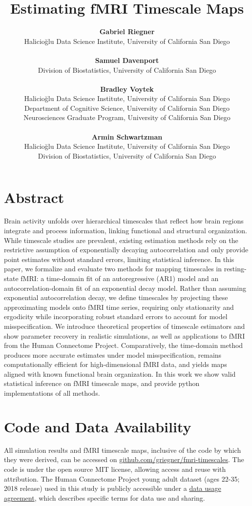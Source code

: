 \documentclass[9pt]{article}
\title{Estimating fMRI Timescale Maps}
\author{
\normalfont
\textbf{Gabriel Riegner}\\
Halicio\u{g}lu Data Science Institute, University of California San Diego\\\\
\textbf{Samuel Davenport}\\
Division of Biostatistics, University of California San Diego\\\\
\textbf{Bradley Voytek}\\
Halicio\u{g}lu Data Science Institute, University of California San Diego\\
Department of Cognitive Science, University of California San Diego\\
Neurosciences Graduate Program, University of California San Diego\\\\
\textbf{Armin Schwartzman}\\
Halicio\u{g}lu Data Science Institute, University of California San Diego\\
Division of Biostatistics, University of California San Diego\\
}
\date{}
\begin{document}
\maketitle

\section*{Abstract}
Brain activity unfolds over hierarchical timescales that reflect how brain regions integrate and process information, linking functional and structural organization. While timescale studies are prevalent, existing estimation methods rely on the restrictive assumption of exponentially decaying autocorrelation and only provide point estimates without standard errors, limiting statistical inference. In this paper, we formalize and evaluate two methods for mapping timescales in resting-state fMRI: a time-domain fit of an autoregressive (AR1) model and an autocorrelation-domain fit of an exponential decay model. Rather than assuming exponential autocorrelation decay, we define timescales by projecting these approximating models onto fMRI time series, requiring only stationarity and ergodicity while incorporating robust standard errors to account for model misspecification. We introduce theoretical properties of timescale estimators and show parameter recovery in realistic simulations, as well as applications to fMRI from the Human Connectome Project. Comparatively, the time-domain method produces more accurate estimates under model misspecification, remains computationally efficient for high-dimensional fMRI data, and yields maps aligned with known functional brain organization. In this work we show valid statistical inference on fMRI timescale maps, and provide python implementations of all methods.

\thispagestyle{empty}
\newpage
\setcounter{page}{1}







\section*{Code and Data Availability}
All simulation results and fMRI timescale maps, inclusive of the code by which they were derived, can be accessed on \href{https://github.com/griegner/fmri-timescales}{github.com/griegner/fmri-timescales}. The code is under the open source MIT license, allowing access and reuse with attribution. The Human Connectome Project young adult dataset (ages 22-35; 2018 release) used in this study is publicly accessible under a \href{https://www.humanconnectome.org/storage/app/media/data_use_terms/DataUseTerms-HCP-Open-Access-26Apr2013.pdf}{data usage agreement}, which describes specific terms for data use and sharing.
\end{document}
